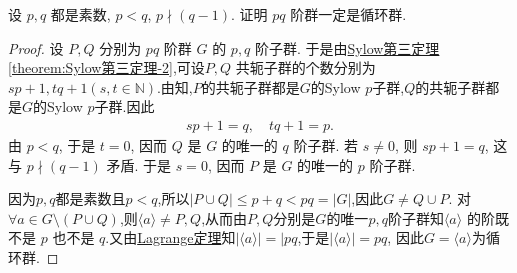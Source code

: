 \documentclass[../../main.tex]{subfiles}%
\begin{document}
\begin{proposition}\label{proposition:阶为特定素数乘积的群必为循环群}
设 $p,q$ 都是素数, $p<q$, $p\nmid (q-1)$. 证明 $pq$ 阶群一定是循环群.
\end{proposition}
\begin{proof}

设 $P,Q$ 分别为 $pq$ 阶群 $G$ 的 $p,q$ 阶子群. 于是由\hyperref[theorem:Sylow第三定理-2]{Sylow第三定理\ref{theorem:Sylow第三定理-2}},可设$P,Q$ 共轭子群的个数分别为$sp+1,tq+1(s,t\in \mathbb{N})$.由知,$P$的共轭子群都是$G$的Sylow $p$子群,$Q$的共轭子群都是$G$的Sylow $p$子群.因此
\begin{align*}
sp+1=q,\quad tq+1=p.
\end{align*}
由 $p<q$, 于是 $t=0$, 因而 $Q$ 是 $G$ 的唯一的 $q$ 阶子群. 若 $s\neq 0$, 则 $sp+1=q$, 这与 $p\nmid (q-1)$ 矛盾. 于是 $s=0$, 因而 $P$ 是 $G$ 的唯一的 $p$ 阶子群.

因为$p,q$都是素数且$p<q$,所以$|P\cup Q|\leqslant p+q<pq=|G|$,因此$G\neq Q\cup P$. 对$\forall a \in G\setminus (P\cup Q)$,则$\langle a\rangle \neq P,Q$,从而由$P,Q$分别是$G$的唯一$p,q$阶子群知$\langle a\rangle$ 的阶既不是 $p$ 也不是 $q$.又由\hyperref[theorem:抽象代数--Lagrange定理]{Lagrange定理}知$|\langle a\rangle|=\mid pq$,于是$|\langle a\rangle|=pq$, 因此$G=\langle a\rangle$为循环群.

\end{proof}
\end{document}
